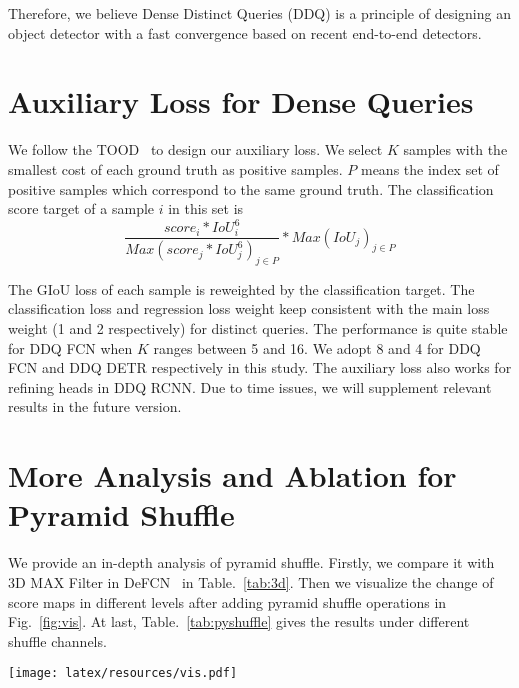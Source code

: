 \documentclass[10pt,twocolumn,letterpaper]{article}
\begin{document}
Therefore, we believe Dense Distinct Queries (DDQ) is a principle of designing an object detector with a fast convergence based on recent end-to-end detectors. 



\section{Auxiliary Loss for Dense Queries}
\label{sec:loss}
We follow the  TOOD~\cite{feng2021tood}  to design our auxiliary loss. We select $K$ samples with the smallest cost of each ground truth as positive samples. $P$ means the index set of positive samples which correspond to the same ground truth. The classification score target of a sample $i$ in this set
is 
\begin{equation}
 \frac{ score_i * IoU_i ^{6}} {Max(score_j * IoU_j ^{6})_{j\in{P}}} * Max(IoU_j)_{j\in{P}}
\end{equation}


The GIoU loss of each sample is reweighted by the classification target. The classification loss and regression loss weight keep consistent with the main loss weight (1 and 2 respectively) for distinct queries. The performance is quite stable for DDQ FCN when $K$ ranges between 5 and 16. We adopt 8 and 4 for DDQ FCN and DDQ DETR respectively in this study. The auxiliary loss also works for refining heads in DDQ RCNN. Due to time issues, we will supplement relevant results in the future version.


\section{More Analysis and Ablation for Pyramid Shuffle}
\label{sec:ana_py}
We provide an in-depth analysis of pyramid shuffle. Firstly, we compare it with 3D MAX Filter in DeFCN~\cite{wang2021end} in Table.~\ref{tab:3d}. Then we visualize the change of score maps in different levels after adding pyramid shuffle operations in Fig.~\ref{fig:vis}. At last, Table.~\ref{tab:pyshuffle} gives the results under different shuffle channels.


 \begin{figure*}[t]
    \centering
    \texttt{[image: latex/resources/vis.pdf]}
      \caption{
    \textbf{Visualization of score map of adjacent levels}. We visualize classification scores with the rainbow color system.  The left side of each subfigure(with blue background) shows score maps with pyramid shuffles, and the corresponding right side (with yellow background) means without pyramid shuffles. The top-left corner marks the feature level. The red circle represents the duplication predictions in the adjacent level.}
    
    \label{fig:vis}
\end{figure*}
\end{document}
